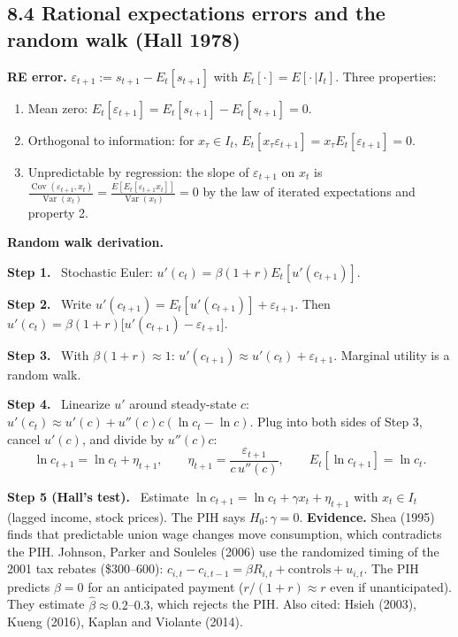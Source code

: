 \documentclass[12pt]{article}
\DeclareMathOperator{\Var}{Var}
\DeclareMathOperator{\Cov}{Cov}
\newcommand{\st}[1]{\par\smallskip\textbf{Step #1.}\ }
\newcommand{\ans}[1]{\[\boxed{\ #1\ }\]}
\begin{document}
\subsection*{8.4 Rational expectations errors and the random walk (Hall 1978)}
\textbf{RE error.} $\varepsilon_{t+1}:=s_{t+1}-E_t[s_{t+1}]$ with $E_t[\cdot]=E[\cdot\,|I_t]$. Three properties:
\begin{enumerate}
\item Mean zero: $E_t[\varepsilon_{t+1}]=E_t[s_{t+1}]-E_t[s_{t+1}]=0$.
\item Orthogonal to information: for $x_\tau\in I_t$, $E_t[x_\tau\varepsilon_{t+1}]=x_\tau E_t[\varepsilon_{t+1}]=0$.
\item Unpredictable by regression: the slope of $\varepsilon_{t+1}$ on $x_t$ is $\frac{\Cov(\varepsilon_{t+1},x_t)}{\Var(x_t)}=\frac{E[E_t[\varepsilon_{t+1}x_t]]}{\Var(x_t)}=0$ by the law of iterated expectations and property 2.
\end{enumerate}
\textbf{Random walk derivation.}
\st{1} Stochastic Euler: $u'(c_t)=\beta(1+r)E_t[u'(c_{t+1})]$.
\st{2} Write $u'(c_{t+1})=E_t[u'(c_{t+1})]+\varepsilon_{t+1}$. Then
$u'(c_t)=\beta(1+r)\big[u'(c_{t+1})-\varepsilon_{t+1}\big]$.
\st{3} With $\beta(1+r)\approx1$: $u'(c_{t+1})\approx u'(c_t)+\varepsilon_{t+1}$. Marginal utility is a random walk.
\st{4} Linearize $u'$ around steady-state $c$: $u'(c_t)\approx u'(c)+u''(c)c(\ln c_t-\ln c)$. Plug into both sides of Step 3, cancel $u'(c)$, and divide by $u''(c)c$:
\ans{\ln c_{t+1}=\ln c_t+\eta_{t+1},\qquad\eta_{t+1}=\frac{\varepsilon_{t+1}}{c\,u''(c)},\qquad E_t[\ln c_{t+1}]=\ln c_t .}
\st{5 (Hall's test)} Estimate $\ln c_{t+1}=\ln c_t+\gamma x_t+\eta_{t+1}$ with $x_t\in I_t$ (lagged income, stock prices). The PIH says $H_0:\gamma=0$.
\textbf{Evidence.} Shea (1995) finds that predictable union wage changes move
consumption, which contradicts the PIH. Johnson, Parker and Souleles (2006)
use the randomized timing of the 2001 tax rebates (\$300--600):
$c_{i,t}-c_{i,t-1}=\beta R_{i,t}+\text{controls}+u_{i,t}$. The PIH predicts
$\beta=0$ for an anticipated payment ($r/(1+r)\approx r$ even if unanticipated).
They estimate $\hat\beta\approx0.2$--$0.3$, which rejects the PIH. Also cited:
Hsieh (2003), Kueng (2016), Kaplan and Violante (2014).
\end{document}
